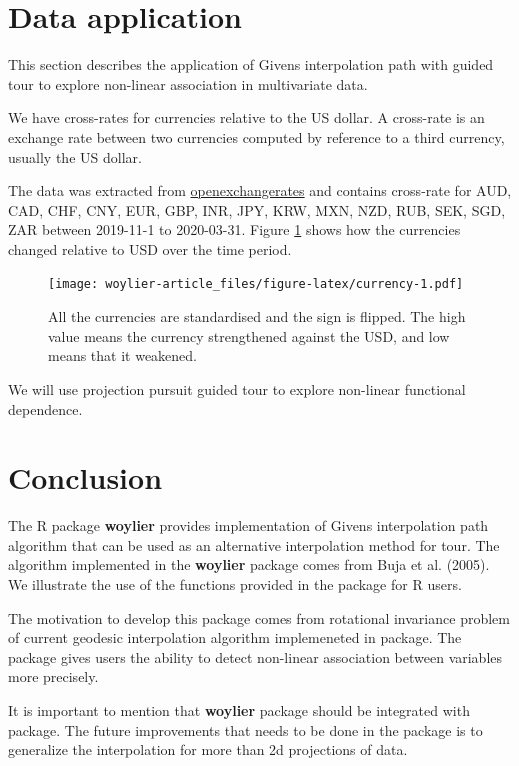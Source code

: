 \hypertarget{data-application}{%
\section{Data application}\label{data-application}}

This section describes the application of Givens interpolation path with guided tour to explore non-linear association in multivariate data.

We have cross-rates for currencies relative to the US dollar. A cross-rate is an exchange rate between two currencies computed by reference to a third currency, usually the US dollar.

The data was extracted from \href{https://openexchangerates.org}{openexchangerates} and contains cross-rate for AUD, CAD, CHF, CNY, EUR, GBP, INR, JPY, KRW, MXN, NZD, RUB, SEK, SGD, ZAR between 2019-11-1 to 2020-03-31. Figure \ref{fig:currency} shows how the currencies changed relative to USD over the time period.

\begin{figure}
\centering
\texttt{[image: woylier-article\_files/figure-latex/currency-1.pdf]}
\caption{\label{fig:currency}All the currencies are standardised and the sign is flipped. The high value means the currency strengthened against the USD, and low means that it weakened.}
\end{figure}

We will use projection pursuit guided tour to explore non-linear functional dependence.

\hypertarget{conclusion}{%
\section{Conclusion}\label{conclusion}}

The R package \textbf{woylier} provides implementation of Givens interpolation path algorithm that can be used as an alternative interpolation method for tour. The algorithm implemented in the \textbf{woylier} package comes from Buja et al. (2005). We illustrate the use of the functions provided in the package for R users.

The motivation to develop this package comes from rotational invariance problem of current geodesic interpolation algorithm implemeneted in  package. The package gives users the ability to detect non-linear association between variables more precisely.

It is important to mention that \textbf{woylier} package should be integrated with  package. The future improvements that needs to be done in the package is to generalize the interpolation for more than 2d projections of data.

